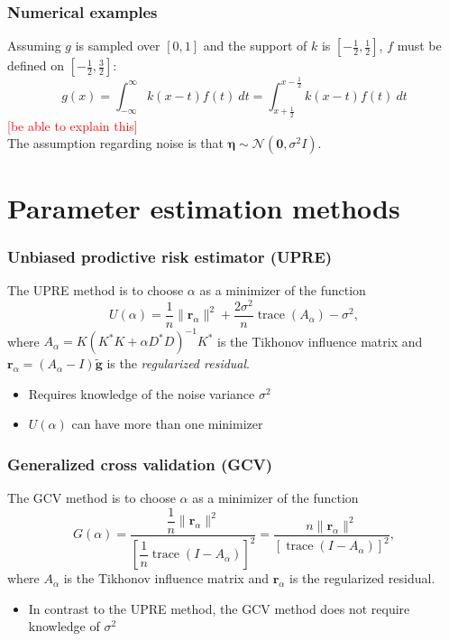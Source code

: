 \documentclass{beamer}
\newcommand{\ToDo}[1]{\textcolor{red}{[#1]}}
\newcommand{\noise}{\eta}	%
\newcommand{\noiseSD}{\sigma}	%
\newcommand{\gnoiseVec}{\widetilde{\mathbf{g}}}	%
\newcommand{\kMat}{K}	%
\newcommand{\ctrans}{*}	%
\newcommand{\noiseVec}{\mathbf{\noise}}	%
\DeclareMathOperator{\trace}{trace}		%
\newcommand{\regparam}{\alpha}
\newcommand{\regres}{\mathbf{r}_{\regparam}}	%
\newcommand{\A}{A_{\regparam}}	%
\newcommand{\U}{U}	%
\newcommand{\GCV}{G}	%
\begin{document}
\begin{frame}
\frametitle{Numerical examples}
Assuming $g$ is sampled over $[0,1]$ and the support of $k$ is $[-\frac{1}{2},\frac{1}{2}]$, $f$ must be defined on $[-\frac{1}{2},\frac{3}{2}]$:
\[g(x) = \int_{-\infty}^{\infty} k(x-t)f(t)~dt = \int_{x+\frac{1}{2}}^{x-\frac{1}{2}} k(x-t)f(t)~dt\]
\ToDo{be able to explain this} \\
The assumption regarding noise is that $\noiseVec \sim \mathcal{N}(\mathbf{0},\noiseSD^2I)$.
\end{frame}

\section{Parameter estimation methods}

\begin{frame}
\frametitle{Unbiased prodictive risk estimator (UPRE)}
The UPRE method is to choose $\regparam$ as a minimizer of the function
\[\U(\regparam) = \frac{1}{n}\|\regres\|^2 + \frac{2\noiseSD^2}{n}\trace(\A) - \noiseSD^2,\]
where $\A = \kMat(\kMat^\ctrans{\kMat} + \regparam{D^\ctrans}D)^{-1}\kMat^\ctrans$ is the Tikhonov influence matrix and $\regres = (\A - I)\gnoiseVec$ is the \textit{regularized residual}.
\begin{itemize}
\item Requires knowledge of the noise variance $\noiseSD^2$
\item $\U(\regparam)$ can have more than one minimizer
\end{itemize}
\end{frame}

\begin{frame}
\frametitle{Generalized cross validation (GCV)}
The GCV method is to choose $\regparam$ as a minimizer of the function
\[\GCV(\regparam) = \frac{\dfrac{1}{n}\|\regres\|^2}{\left[\dfrac{1}{n}\trace(I-\A)\right]^2} = \frac{n\|\regres\|^2}{\left[\trace(I-\A)\right]^2},\]
where $\A$ is the Tikhonov influence matrix and $\regres$ is the regularized residual.
\begin{itemize}
\item In contrast to the UPRE method, the GCV method does not require knowledge of $\noiseSD^2$
\end{itemize}
\end{frame}
\end{document}
